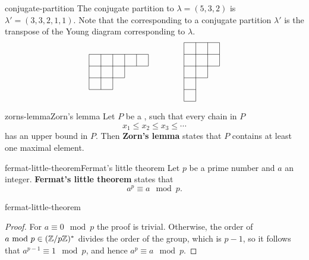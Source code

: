 \begin{example}{conjugate-partition}
    The conjugate partition to $\lambda = (5, 3, 2)$ is $\lambda' = (3, 3, 2, 1, 1)$. Note that the  corresponding to a conjugate partition $\lambda'$ is the transpose of the Young diagram corresponding to $\lambda$.
    \[ \begin{tikzpicture}
        \begin{scope}[scale=0.5]
            \draw (0, 3) -- (5, 3); \draw (0, 2) -- (5, 2); \draw (0, 1) -- (3, 1); \draw (0, 0) -- (2, 0); \draw (0, 3) -- (0, 0); \draw (1, 3) -- (1, 0); \draw (2, 3) -- (2, 0); \draw (3, 3) -- (3, 1); \draw (4, 3) -- (4, 2); \draw (5, 3) -- (5, 2);
        \end{scope}
        \begin{scope}[scale=0.5, shift={(8, -1)}]
            \draw (0, 5) -- (3, 5); \draw (0, 4) -- (3, 4); \draw (0, 3) -- (3, 3); \draw (0, 2) -- (2, 2); \draw (0, 1) -- (1, 1); \draw (0, 0) -- (1, 0); \draw (0, 0) -- (0, 5); \draw (1, 0) -- (1, 5); \draw (2, 2) -- (2, 5); \draw (3, 3) -- (3, 5);
        \end{scope}
    \end{tikzpicture}\]
\end{example}

\begin{topic}{zorns-lemma}{Zorn's lemma}
    Let $P$ be a , such that every chain in $P$
    \[ x_1 \le x_2 \le x_3 \le \cdots \]
    has an upper bound in $P$. Then \textbf{Zorn's lemma} states that $P$ contains at least one maximal element.
\end{topic}

\begin{topic}{fermat-little-theorem}{Fermat's little theorem}
    Let $p$ be a prime number and $a$ an integer. \textbf{Fermat's little theorem} states that
    \[ a^p \equiv a \mod p . \]
\end{topic}

\begin{example}{fermat-little-theorem}
    \begin{proof}
        For $a \equiv 0 \mod p$ the proof is trivial. Otherwise, the order of $a \textup{ mod } p \in (\mathbb{Z}/p\mathbb{Z})^*$ divides the order of the group, which is $p - 1$, so it follows that $a^{p - 1} \equiv 1 \mod p$, and hence $a^p \equiv a \mod p$.
    \end{proof}
\end{example}

